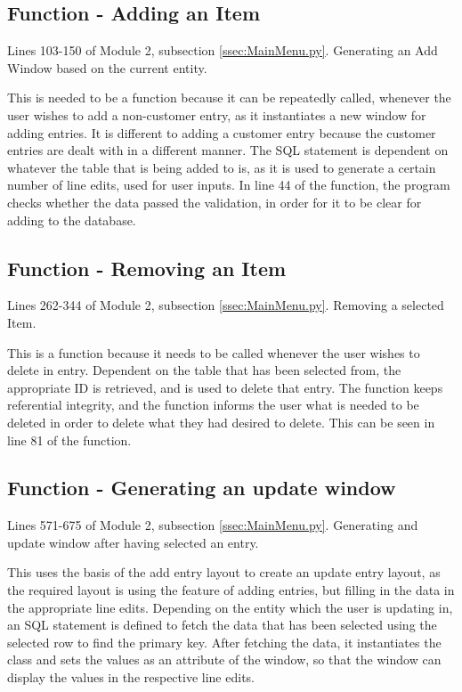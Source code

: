 \subsection{Function - Adding an Item}
Lines 103-150 of Module 2, subsection \ref{ssec:MainMenu.py}. Generating an Add Window based on the current entity.
\begin{tiny}
\end{tiny}
This is needed to be a function because it can be repeatedly called, whenever the user wishes to add a non-customer entry, as it instantiates a new window for adding entries. It is different to adding a customer entry because the customer entries are dealt with in a different manner. The SQL statement is dependent on whatever the table that is being added to is, as it is used to generate a certain number of line edits, used for user inputs. In line 44 of the function, the program checks whether the data passed the validation, in order for it to be clear for adding to the database.

\subsection{Function - Removing an Item}
Lines 262-344 of Module 2, subsection \ref{ssec:MainMenu.py}. Removing a selected Item.
\begin{tiny}
\end{tiny}
This is a function because it needs to be called whenever the user wishes to delete in entry. Dependent on the table that has been selected from, the appropriate ID is retrieved, and is used to delete that entry. The function keeps referential integrity, and the function informs the user what is needed to be deleted in order to delete what they had desired to delete. This can be seen in line 81 of the function.

\subsection{Function - Generating an update window}
Lines 571-675 of Module 2, subsection \ref{ssec:MainMenu.py}. Generating and update window after having selected an entry.
\begin{tiny}
\end{tiny}
This uses the basis of the add entry layout to create an update entry layout, as the required layout is using the feature of adding entries, but filling in the data in the appropriate line edits. Depending on the entity which the user is updating in, an SQL statement is defined to fetch the data that has been selected using the selected row to find the primary key. After fetching the data, it instantiates the class and sets the values as an attribute of the window, so that the window can display the values in the respective line edits.

